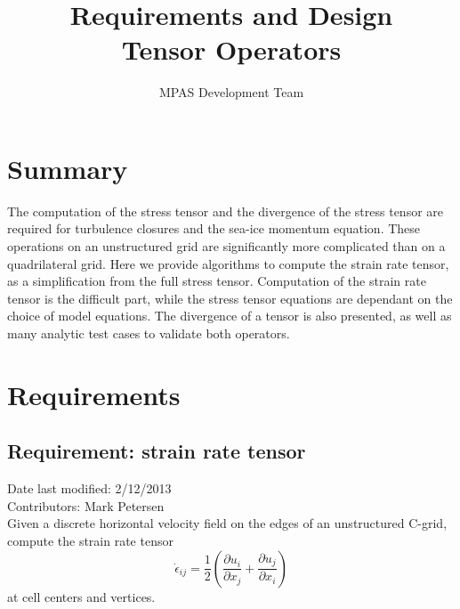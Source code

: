 \documentclass[11pt]{report}
\begin{document}
\title{
Requirements and Design\\
Tensor Operators}
\author{MPAS Development Team}

\maketitle
\tableofcontents


\chapter{Summary}

The computation of the stress tensor and the divergence of the stress tensor are required for turbulence closures and the sea-ice momentum equation.  These operations on an unstructured grid are significantly more complicated than on a quadrilateral grid.  Here we provide algorithms to compute the strain rate tensor, as a simplification from the full stress tensor.  Computation of the strain rate tensor is the difficult part, while the stress tensor equations are dependant on the choice of model equations.  The divergence of a tensor is also presented, as well as many analytic test cases to validate both operators.




\chapter{Requirements}

\section{Requirement: strain rate tensor}
Date last modified: 2/12/2013 \\
Contributors: Mark Petersen \\

 Given a discrete horizontal velocity field on the edges of an unstructured C-grid, compute the strain rate tensor 
\begin{equation}
\dot{\epsilon}_{ij} = \frac{1}{2}\left(\frac{\partial u_i}{\partial x_j} 
                                     + \frac{\partial u_j}{\partial x_i}\right)
\end{equation}
at cell centers and vertices.  
\end{document}
